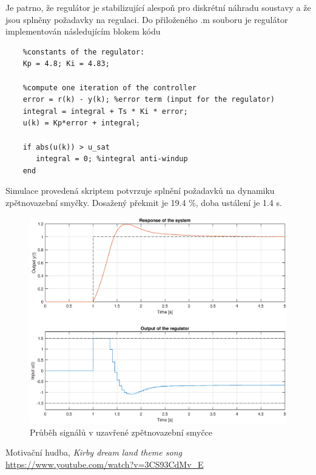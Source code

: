 \documentclass[twoside]{article}
\begin{document}
Je patrno, že regulátor je stabilizující alespoň pro diskrétní náhradu soustavy a že jsou splněny požadavky na regulaci.
Do přiloženého .m souboru je regulátor implementován následujícím blokem kódu

\begin{lstlisting}
    %constants of the regulator:
    Kp = 4.8; Ki = 4.83;
    
    %compute one iteration of the controller
    error = r(k) - y(k); %error term (input for the regulator)
    integral = integral + Ts * Ki * error;
    u(k) = Kp*error + integral;
    
    if abs(u(k)) > u_sat
       integral = 0; %integral anti-windup
    end
\end{lstlisting}

Simulace provedená skriptem potvrzuje splnění požadavků na dynamiku zpětnovazební smyčky.
Dosažený překmit je 19.4 \%, doba ustálení je 1.4 \si{\second}.

\begin{figure}[htbp]
	\centering
	\includegraphics[width=.6\linewidth]{odezva_spojity.eps}
	\caption{Průběh signálů v uzavřené zpětnovazební smyčce}
	\label{fig:vysledek}
\end{figure}



\begin{thebibliography}{9}

		Motivační hudba, \emph{Kirby dream land theme song} \url{https://www.youtube.com/watch?v=3CS93CdMv_E}
	
	\end{thebibliography}
\end{document}
